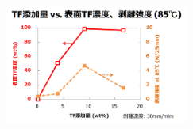 \documentclass[12pt, dvipdfmx]{beamer}
\begin{document}
\begin{frame}
\begin{columns}
\begin{column}{6.0cm}
\begin{figure}[htbp]
			\begin{center}
				\includegraphics[width=60mm]{nakamura-1.png}
			\end{center}
		\end{figure}
	\end{column}
\end{columns}

\end{frame}
\end{document}

